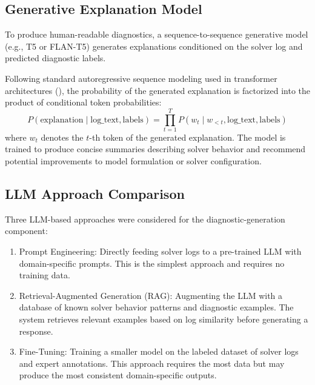 \documentclass[11pt]{article}
\begin{document}
\subsection{Generative Explanation Model}

To produce human-readable diagnostics, a sequence-to-sequence generative model (e.g., T5 or FLAN-T5) generates explanations conditioned on the solver log and predicted diagnostic labels. 

Following standard autoregressive sequence modeling used in transformer architectures (\cite{raffel2020t5}), the probability of the generated explanation is factorized into the product of conditional token probabilities:
\begin{equation}
    P(\text{explanation} \mid \text{log\_text}, \text{labels}) = \prod_{t=1}^{T} P(w_t \mid w_{<t}, \text{log\_text}, \text{labels})
\end{equation}
where $w_t$ denotes the $t$-th token of the generated explanation. The model is trained to produce concise summaries describing solver behavior and recommend potential improvements to model 
formulation or solver configuration.

\subsection{LLM Approach Comparison}

Three LLM-based approaches were considered for the diagnostic-generation component:
\begin{enumerate}
    \item Prompt Engineering: Directly feeding solver logs to a pre-trained LLM with domain-specific prompts. This is the simplest approach and requires no training data.
    \item Retrieval-Augmented Generation (RAG): Augmenting the LLM with a database of known solver behavior patterns and diagnostic examples. The system retrieves relevant examples based on log similarity before generating a response.
    \item Fine-Tuning: Training a smaller model on the labeled dataset of solver logs and expert annotations. This approach requires the most data but may produce the most consistent domain-specific outputs.
\end{enumerate}
\end{document}
